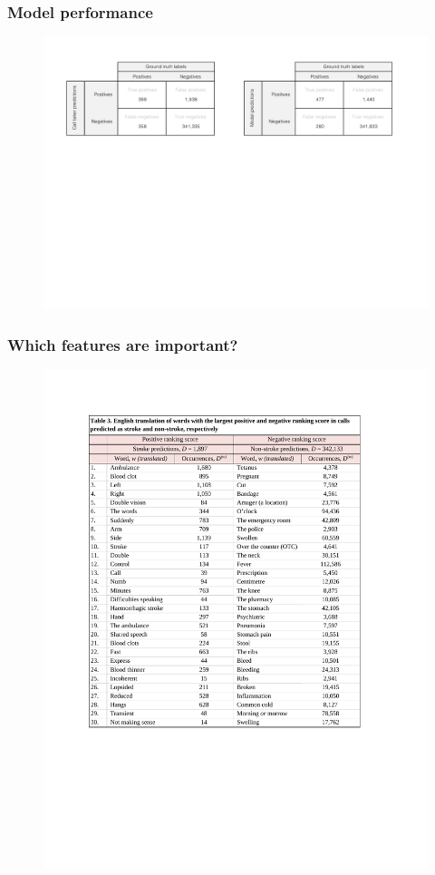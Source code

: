 \begin{frame}
    \frametitle{Model performance}
    \begin{figure}
        \centering
        \includegraphics[width=0.95\paperwidth]{../graphics/paper_retrospective/figure2.pdf}
    \end{figure}
\end{frame}


\begin{frame}
    \frametitle{Which features are important?}
    \begin{figure}
        \centering
        \includegraphics[width=0.4\paperwidth]{../graphics/paper_retrospective/table3.pdf}
    \end{figure}
\end{frame}


